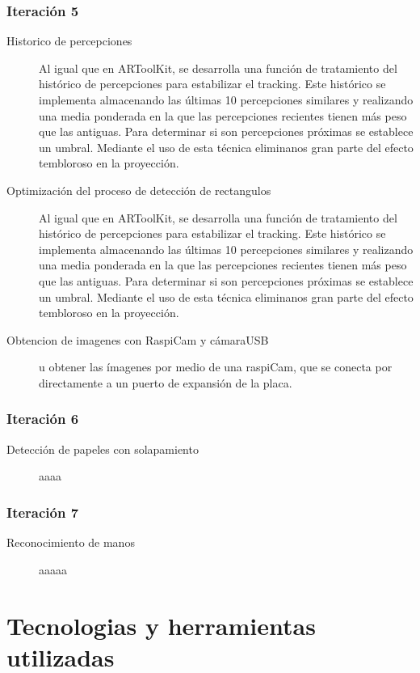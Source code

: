 \subsubsection{Iteración 5}
\begin{description}
\item [Historico de percepciones] Al igual que en ARToolKit, se desarrolla una función de tratamiento del histórico de percepciones para estabilizar el tracking. Este histórico se implementa  almacenando las últimas 10 percepciones similares y realizando una media ponderada en la que las percepciones recientes tienen más peso que las antiguas. Para determinar si son percepciones próximas se establece un umbral. Mediante el uso de esta técnica eliminanos gran parte del efecto tembloroso en la proyección.
\item [Optimización del proceso de detección de rectangulos] Al igual que en ARToolKit, se desarrolla una función de tratamiento del histórico de percepciones para estabilizar el tracking. Este histórico se implementa  almacenando las últimas 10 percepciones similares y realizando una media ponderada en la que las percepciones recientes tienen más peso que las antiguas. Para determinar si son percepciones próximas se establece un umbral. Mediante el uso de esta técnica eliminanos gran parte del efecto tembloroso en la proyección.
\item [Obtencion de imagenes con RaspiCam y cámaraUSB] u obtener las ímagenes por medio de una raspiCam, que se conecta por directamente a un puerto de expansión de la placa.
\end{description}

\subsubsection{Iteración 6}
\begin{description}
\item [Detección de papeles con solapamiento] aaaa
\end{description}
\subsubsection{Iteración 7}
\begin{description}
\item [Reconocimiento de manos] aaaaa
\end{description}


\section{Tecnologias y herramientas utilizadas}

